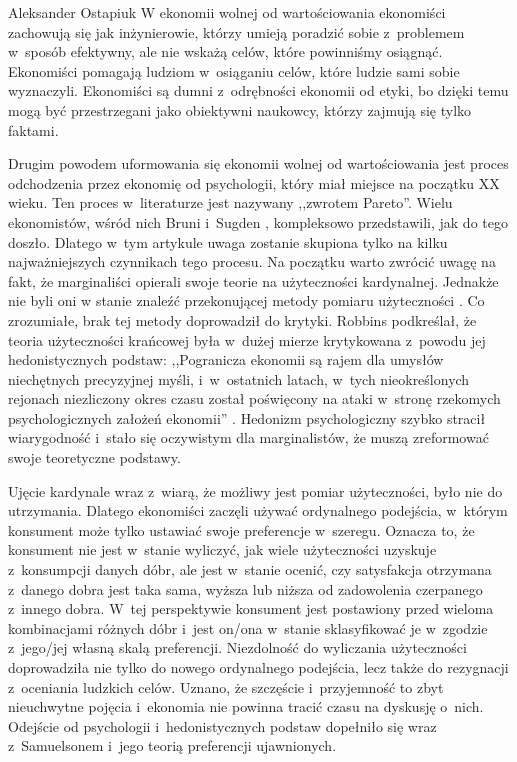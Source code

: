 \begin{artplenv}{Aleksander Ostapiuk}
W ekonomii wolnej od wartościowania ekonomiści zachowują się jak inżynierowie, którzy umieją poradzić sobie z~problemem
w~sposób efektywny, ale nie wskażą celów, które powinniśmy osiągnąć. Ekonomiści pomagają ludziom w~osiąganiu celów,
które ludzie sami sobie wyznaczyli. Ekonomiści są dumni z~odrębności ekonomii od etyki, bo dzięki temu mogą być przestrzegani
jako obiektywni naukowcy, którzy zajmują się tylko faktami. 

Drugim powodem uformowania się ekonomii wolnej od wartościowania jest proces odchodzenia przez ekonomię od psychologii,
który miał miejsce na początku XX wieku. Ten proces w~literaturze jest nazywany ,,zwrotem Pareto''. Wielu ekonomistów,
wśród nich Bruni i~Sugden
\parencite*{bruni_road_2007},
kompleksowo przedstawili, jak do tego doszło. Dlatego w~tym
artykule uwaga zostanie skupiona tylko na kilku najważniejszych czynnikach tego procesu. Na początku warto zwrócić
uwagę na fakt, że marginaliści opierali swoje teorie na użyteczności kardynalnej. Jednakże nie byli oni w
stanie znaleźć przekonującej metody pomiaru użyteczności
\parencite{stigler_development_1950}.
Co zrozumiałe,
brak tej metody doprowadził do krytyki. Robbins podkreślał, że teoria użyteczności krańcowej była w~dużej mierze
krytykowana z~powodu jej hedonistycznych podstaw: ,,Pogranicza ekonomii są rajem dla umysłów niechętnych precyzyjnej
myśli, i~w~ostatnich latach, w~tych nieokreślonych rejonach niezliczony okres czasu został poświęcony na ataki w~stronę
rzekomych psychologicznych założeń ekonomii''
\parencite[s.~83]{robbins_essay_1935}.
Hedonizm psychologiczny
szybko stracił wiarygodność i~stało się oczywistym dla marginalistów, że muszą zreformować swoje teoretyczne podstawy. 

Ujęcie kardynale wraz z~wiarą, że możliwy jest pomiar użyteczności, było nie do utrzymania. Dlatego ekonomiści zaczęli używać
ordynalnego podejścia, w~którym konsument może tylko ustawiać swoje preferencje w~szeregu. Oznacza to, że konsument nie
jest w~stanie wyliczyć, jak wiele użyteczności uzyskuje z~konsumpcji danych dóbr, ale jest w~stanie ocenić, czy
satysfakcja otrzymana z~danego dobra jest taka sama, wyższa lub niższa od zadowolenia czerpanego z~innego dobra. W~tej
perspektywie konsument jest postawiony przed wieloma kombinacjami różnych dóbr i~jest on/ona w~stanie sklasyfikować je
w~zgodzie z~jego/jej własną skalą preferencji. Niezdolność do wyliczania użyteczności doprowadziła nie tylko do nowego
ordynalnego podejścia, lecz także do rezygnacji z~oceniania ludzkich celów. Uznano, że
szczęście i~przyjemność to zbyt nieuchwytne pojęcia i~ekonomia nie powinna tracić czasu na dyskusję o~nich.
Odejście od psychologii i~hedonistycznych podstaw dopełniło się wraz z~Samuelsonem i~jego teorią preferencji ujawnionych. 


\end{artplenv}
